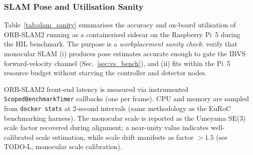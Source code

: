 
\subsubsection{SLAM Pose and Utilisation Sanity}
\label{sec:slam_sanity}

Table~\ref{tab:slam_sanity} summarises the accuracy and on-board utilisation
of ORB-SLAM2 running as a containerised sidecar on the Raspberry Pi~5 during
the HIL benchmark. The purpose is a \emph{workplacement sanity check}: verify
that monocular SLAM (i) produces pose estimates accurate enough to gate the
IBVS forward-velocity channel (Sec.~\ref{sec:vs_bench}), and (ii) fits within
the Pi~5 resource budget without starving the controller and detector nodes.

ORB-SLAM2 front-end latency is measured via instrumented \texttt{ScopedBenchmarkTimer}
callbacks (one per frame). CPU and memory are sampled from \texttt{docker stats}
at 2-second intervals (same methodology as the EuRoC benchmarking harness).
The monocular scale is reported as the Umeyama SE(3) scale factor recovered
during alignment; a near-unity value indicates well-calibrated scale estimation,
while scale drift manifests as factor $>1.5$ (see TODO-L, monocular scale calibration).

